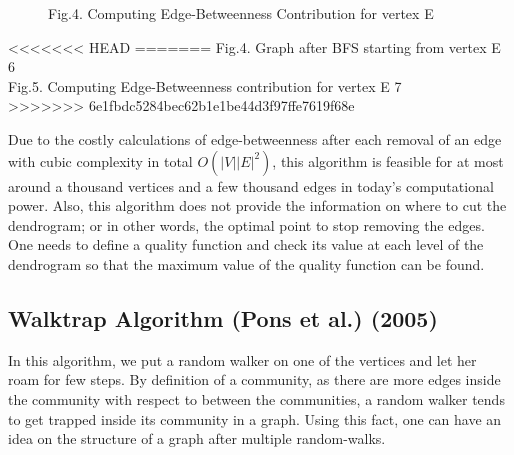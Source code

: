 \documentclass[10pt]{article}
\begin{document}
\begin{figure}
    \caption{Fig.4. Computing Edge-Betweenness Contribution for vertex E}
    \label{fig:awesome_image}
\end{figure}

<<<<<<< HEAD
=======
Fig.4. Graph after BFS starting from vertex E 6 \\

Fig.5. Computing Edge-Betweenness contribution for vertex E 7 \\
>>>>>>> 6e1fbdc5284bec62b1e1be44d3f97ffe7619f68e

Due to the costly calculations of edge-betweenness after each removal of an edge with cubic complexity in total $O\left(|V||E|^2 \right)$, this algorithm is feasible for at most around a thousand vertices and a few thousand edges in today’s computational power. Also, this algorithm does not provide the information on where to cut the dendrogram; or in other words, the optimal point to stop removing the edges. One needs to define a quality function and check its value at each level of the dendrogram so that the maximum value of the quality function can be found. \\

\subsection{Walktrap Algorithm (Pons et al.) (2005)}

In this algorithm, we put a random walker on one of the vertices and let her roam for few steps. By definition of a community, as there are more edges inside the community with respect to between the communities, a random walker tends to get trapped inside its community in a graph. Using this fact, one can have an idea on the structure of a graph after multiple random-walks. \\
\end{document}
